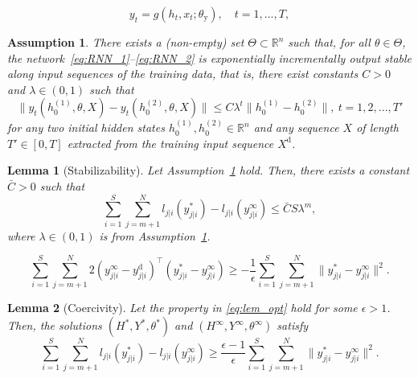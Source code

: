 \documentclass[10pt,a4paper]{amsart}
\newtheorem{ass}{Assumption}
\newtheorem{lem}{Lemma}
\begin{document}
\begin{equation}\label{eq:RNN_2}
	y_t = g(h_t,x_t;\theta_\mathrm{y}), \quad t=1,...,T,
\end{equation}

\begin{ass}\label{ass:output_stability}
	There exists a (non-empty) set $\Theta\subset\mathbb{R}^{n}$ such that, for all $\theta\in\Theta$, the network~\eqref{eq:RNN_1}--\eqref{eq:RNN_2} is exponentially incrementally output stable along input sequences of the training data, that is, there exist constants $C>0$ and $\lambda\in(0,1)$ such that
	\begin{equation}
		\|y_t(h_0^{(1)},{\theta},X)-y_t(h_0^{(2)},{\theta},X)\| \leq 	C\lambda^t\|h_0^{(1)}-h_0^{(2)}\|,\ t=1,2,...,T' \label{eq:output_stability}
	\end{equation}
	for any two initial hidden states $h^{(1)}_{0},h^{(2)}_{0}\in\mathbb{R}^n$ and any sequence $X$ of length $T'\in[0,T]$ extracted from the training input sequence $X^\mathrm{d}$.
\end{ass}

\begin{lem}[Stabilizability]\label{lem:controllability}
	Let Assumption~\ref{ass:output_stability} hold. Then, there exists a constant $\bar{C}>0$ such that
	\begin{equation}\label{eq:controllability}
		\sum_{i=1}^{S}\sum_{j=m+1}^{N}l_{j|i}({y}_{j|i}^*)-l_{j|i}({y}^\infty_{j|i}) \leq \bar{C}S\lambda^m,
	\end{equation}
	where $\lambda\in(0,1)$ is from Assumption~\ref{ass:output_stability}.
\end{lem}

	\begin{equation}\label{eq:lem_opt}
		\sum_{i=1}^{S}\sum_{j=m+1}^{N} 2({y}_{j|i}^\infty-{y}_{j|i}^\mathrm{d})^\top({y}_{j|i}^*-{y}_{j|i}^\infty) \geq-\frac{1}{\epsilon}\sum_{i=1}^{S}\sum_{j=m+1}^{N}\|{y}_{j|i}^*-{y}_{j|i}^\infty\|^2.
	\end{equation}

\begin{lem}[Coercivity]\label{lem:coercivity}
	Let the property in \eqref{eq:lem_opt} hold for some $\epsilon>1$. Then, the solutions $(H^*,Y^*,\theta^*)$ and $(H^\infty,Y^\infty,\theta^\infty)$ satisfy
	\begin{equation}\label{eq:lem_coercive}
		\sum_{i=1}^{S}\sum_{j=m+1}^{N}l_{j|i}({y}_{j|i}^*)-l_{j|i}({y}^\infty_{j|i}) \geq \frac{\epsilon-1}{\epsilon} \sum_{i=1}^{S}\sum_{j=m+1}^{N}\|{y}^*_{j|i}-{y}_{j|i}^\infty\|^2.
	\end{equation}
\end{lem}
\end{document}

